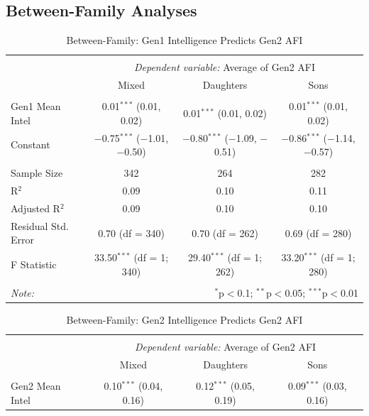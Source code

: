 \documentclass[a4paper,man,apacite,natbib,12pt,longtable]{apa6}\usepackage[]{graphicx}\usepackage[]{color}
\begin{document}
\begin{landscape}
  \subsection{Between-Family Analyses}
  \begin{longtable}{@{\extracolsep{5pt}}lccc} 
  \caption{Between-Family: Gen1 Intelligence Predicts Gen2 AFI} \label{table_Mean_Mom_Intelligence_Mean_Child_AFI_11}
  \\[-1.8ex]\hline 
  \hline \\[-3.8ex] 
  & \multicolumn{3}{c}{\textit{Dependent variable:} Average of Gen2 AFI} \\ 
  \cline{2-4}
 & Mixed & Daughters & Sons \\ 
\hline \\[-1.8ex] 
 Gen1 Mean Intel & 0.01$^{***}$ (0.01, 0.02) & 0.01$^{***}$ (0.01, 0.02) & 0.01$^{***}$ (0.01, 0.02) \\ 
  Constant & $-$0.75$^{***}$ ($-$1.01, $-$0.50) & $-$0.80$^{***}$ ($-$1.09, $-$0.51) & $-$0.86$^{***}$ ($-$1.14, $-$0.57) \\ 
 \hline \\[-1.8ex] 
Sample Size & 342 & 264 & 282 \\ 
R$^{2}$ & 0.09 & 0.10 & 0.11 \\ 
Adjusted R$^{2}$ & 0.09 & 0.10 & 0.10 \\ 
Residual Std. Error & 0.70 (df = 340) & 0.70 (df = 262) & 0.69 (df = 280) \\ 
F Statistic & 33.50$^{***}$ (df = 1; 340) & 29.40$^{***}$ (df = 1; 262) & 33.20$^{***}$ (df = 1; 280) \\ 
\hline 
\hline \\[-1.8ex] 
\textit{Note:}  & \multicolumn{3}{r}{$^{*}$p$<$0.1; $^{**}$p$<$0.05; $^{***}$p$<$0.01} \\ 
  \end{longtable}\pagebreak
  \begin{longtable}{@{\extracolsep{5pt}}lccc} 
  \caption{Between-Family: Gen2 Intelligence Predicts Gen2 AFI} \label{table_Mean_Child_Intelligence_Mean_Child_AFI_11}
  \\[-1.8ex]\hline 
  \hline \\[-3.8ex] 
  & \multicolumn{3}{c}{\textit{Dependent variable:} Average of Gen2 AFI} \\ 
  \cline{2-4}
   & Mixed & Daughters & Sons \\ 
\hline \\[-1.8ex] 
 Gen2 Mean Intel & 0.10$^{***}$ (0.04, 0.16) & 0.12$^{***}$ (0.05, 0.19) & 0.09$^{***}$ (0.03, 0.16) \\ 

\end{longtable}
\end{landscape}
\end{document}
